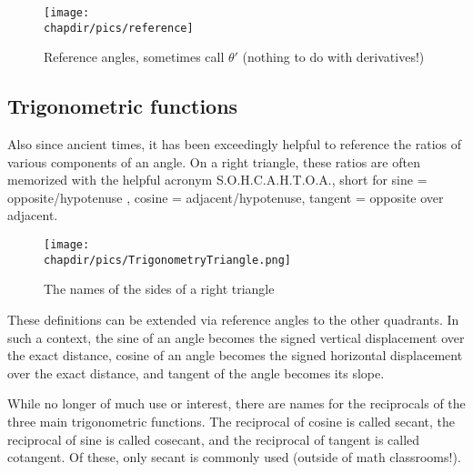 \begin{figure}[h]
\begin{center}
\texttt{[image: \\chapdir/pics/reference]}
\caption{Reference angles, sometimes call $\theta'$ (nothing to do with derivatives!)}
\end{center}
\end{figure}


\subsection{Trigonometric functions}
Also since ancient times, it has been exceedingly helpful to reference the ratios of
various components of an angle.  On a right triangle, these ratios are often memorized with
the helpful acronym S.O.H.C.A.H.T.O.A., short for sine = opposite/hypotenuse , cosine = 
adjacent/hypotenuse, tangent = opposite over adjacent.

\begin{figure}[h]
\texttt{[image: \\chapdir/pics/TrigonometryTriangle.png]}
\caption{The names of the sides of a right triangle}
\end{figure}

These definitions can be extended via reference angles to the other quadrants.  In 
such a context, the sine of an angle 
becomes the signed vertical displacement over the exact distance, cosine of an
angle becomes the signed horizontal displacement over the exact distance,
and tangent of the angle becomes its slope.

While no longer of much use or interest, there are names for the reciprocals of
the three main trigonometric functions.  The reciprocal of cosine is called
secant, the reciprocal of sine is called cosecant, and the reciprocal of tangent
is called cotangent.  Of these, only secant is commonly used (outside of math
classrooms!).

